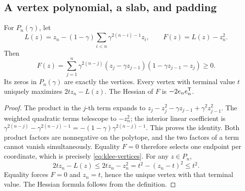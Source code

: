 \subsection{A vertex polynomial, a slab, and padding}
\begin{lemma}\label{lem:klee-telescope}
For \(P_n(\gamma)\), let
\[
 L(z)=z_n-(1-\gamma)\sum_{i<n}\gamma^{2(n-i)-1}z_i,
 \qquad F(z)=L(z)-z_n^2.
\]
Then
\begin{equation}\label{eq:klee-telescoping}
 F(z)=\sum_{j=1}^n\gamma^{2(n-j)}
   (z_j-\gamma z_{j-1})(1-\gamma z_{j-1}-z_j)\ge0.
\end{equation}
Its zeros in \(P_n(\gamma)\) are exactly the vertices. Every vertex with
terminal value \(t\) uniquely maximizes \(2tz_n-L(z)\). The Hessian of \(F\)
is \(-2e_ne_n^{\mathsf T}\).
\end{lemma}
\begin{proof}
The product in the \(j\)-th term expands to
\(z_j-z_j^2-\gamma z_{j-1}+\gamma^2z_{j-1}^2\).
The weighted quadratic terms telescope to \(-z_n^2\); the interior linear
coefficient is
\(\gamma^{2(n-j)}-\gamma^{2(n-j)-1}=-(1-\gamma)\gamma^{2(n-j)-1}\).
This proves the identity. Both product factors are nonnegative on the
polytope, and the two factors of a term cannot vanish simultaneously. Equality
\(F=0\) therefore selects one endpoint per coordinate, which is precisely
\eqref{eq:klee-vertices}.
For any \(z\in P_n\),
\[
 2tz_n-L(z)\le2tz_n-z_n^2=t^2-(z_n-t)^2\le t^2.
\]
Equality forces \(F=0\) and \(z_n=t\), hence the unique vertex with that
terminal value. The Hessian formula follows from the definition.
\end{proof}

